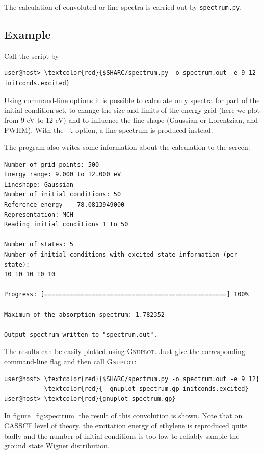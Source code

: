 \documentclass[a4paper,11pt,DIV=15,openany]{scrbook}
\newcommand{\ttt}[1]{\texttt{#1}}
\begin{document}
The calculation of convoluted or line spectra is carried out by \ttt{spectrum.py}. 

\subsection{Example}

Call the script by
\begin{Verbatim}[commandchars=\\\{\}]
user@host> \textcolor{red}{$SHARC/spectrum.py -o spectrum.out -e 9 12 initconds.excited}
\end{Verbatim}
Using command-line options it is possible to calculate only spectra for part of the initial condition set, to change the size and limits of the energy grid (here we plot from 9 eV to 12 eV) and to influence the line shape (Gaussian or Lorentzian, and FWHM). With the \ttt{-l} option, a line spectrum is produced instead.

The program also writes some information about the calculation to the screen:
\begin{oframed}
\footnotesize\begin{Verbatim}[commandchars=\\\{\}]
Number of grid points: 500
Energy range: 9.000 to 12.000 eV
Lineshape: Gaussian
Number of initial conditions: 50
Reference energy   -78.0813949000
Representation: MCH
Reading initial conditions 1 to 50

Number of states: 5
Number of initial conditions with excited-state information (per state):
10 10 10 10 10 

Progress: [==================================================] 100%

Maximum of the absorption spectrum: 1.782352

Output spectrum written to "spectrum.out".
\end{Verbatim}
\end{oframed}

\normalsize
The results can be easily plotted using \textsc{Gnuplot}. Just give the corresponding command-line flag and then call \textsc{Gnuplot}:
\begin{Verbatim}[commandchars=\\\{\}]
user@host> \textcolor{red}{$SHARC/spectrum.py -o spectrum.out -e 9 12}
           \textcolor{red}{--gnuplot spectrum.gp initconds.excited}
user@host> \textcolor{red}{gnuplot spectrum.gp}
\end{Verbatim}


In figure~\ref{fig:spectrum} the result of this convolution is shown. Note that on CASSCF level of theory, the excitation energy of ethylene is reproduced quite badly and the number of initial conditions is too low to reliably sample the ground state Wigner distribution.
\end{document}
